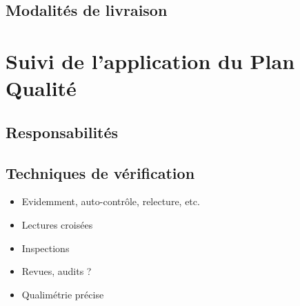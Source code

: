 \section{Modalités de livraison}

\chapter{Suivi de l'application du Plan Qualité}

\section{Responsabilités}

\section{Techniques de vérification}

\begin{itemize}
\item Evidemment, auto-contrôle, relecture, etc.
\item Lectures croisées
\item Inspections
\item Revues, audits ?
\item Qualimétrie précise
\end{itemize}